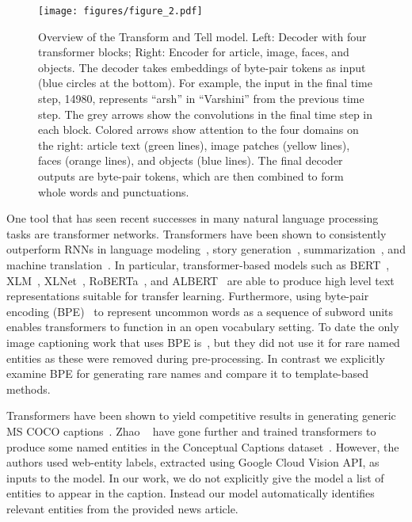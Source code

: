 \begin{figure*}[t]
   \begin{center}
      \texttt{[image: figures/figure\_2.pdf]}
   \end{center}

   \capmoveup
   \caption{Overview of the Transform and Tell model. Left: Decoder with four
      transformer blocks; Right: Encoder for article, image, faces, and
      objects. The decoder takes embeddings of byte-pair tokens as input (blue
      circles at the bottom). For example, the input in the final time step,
      14980, represents ``arsh'' in ``Varshini'' from the previous time step.
      The grey arrows show the convolutions in the final time step in each
      block. Colored arrows show attention to the four domains on the right:
      article text (green lines), image patches (yellow lines), faces (orange
      lines), and objects (blue lines). The final decoder outputs are byte-pair
      tokens, which are then combined to form whole words and punctuations.}
   \postfigmoveup
   \label{fig:model}
\end{figure*}

One tool that has seen recent successes in many natural language processing
tasks are transformer networks. Transformers have been shown to consistently
outperform RNNs in language modeling~\cite{Radford2019LanguageMA},
story generation~\cite{Fan2018HierarchicalNS},
summarization~\cite{Subramanian2019OnEA}, and machine
translation~\cite{Bojar2018Findings}. In particular, transformer-based models
such as BERT~\cite{Devlin2019BERT}, XLM~\cite{Lample2019CrosslingualLM},
XLNet~\cite{Yang2019XLNetGA}, RoBERTa~\cite{Liu2019RoBERTaAR}, and
ALBERT~\cite{Lan2019ALBERT} are able to produce high level text representations
suitable for transfer learning. Furthermore, using byte-pair encoding
(BPE)~\cite{Sennrich2015NeuralMT} to represent uncommon words as a sequence of
subword units enables transformers to function in an open vocabulary setting.
To date the only image captioning work that uses BPE
is~\cite{Zhao2019InformativeIC}, but they did not use it for rare named
entities as these were removed during pre-processing. In contrast we explicitly
examine BPE for generating rare names and compare it to template-based methods.

Transformers have been shown to yield competitive results in generating generic
MS COCO captions~\cite{Zhu2018CaptioningTW, Li2019Boosted}. Zhao
\etal~\cite{Zhao2019InformativeIC} have gone further and trained transformers
to produce some named entities in the Conceptual Captions
dataset~\cite{Sharma2018ConceptualCA}. However, the authors used web-entity labels, extracted using
Google Cloud Vision API, as inputs to the model. In our work, we do not
explicitly give the model a list of entities to appear in the caption. Instead
our model automatically identifies relevant entities from the provided news
article.


